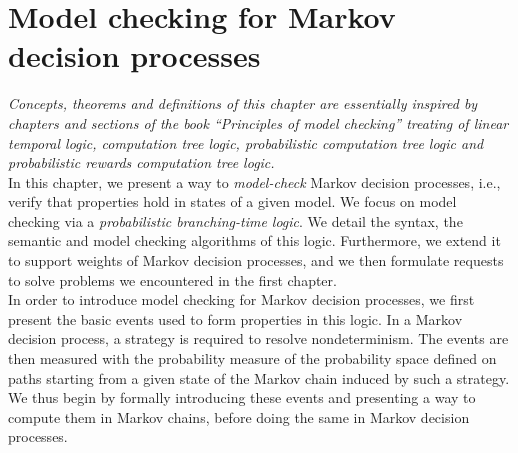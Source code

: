 \chapter{Model checking for Markov decision processes} \label{model-checking-chapter}

\textit{Concepts, theorems and definitions of this chapter are essentially inspired by chapters and sections of the book ``Principles of model checking'' \cite{PMC} treating of linear temporal logic, computation tree logic, probabilistic computation tree logic and probabilistic rewards computation tree logic.}\\

In this chapter, we present a way to \textit{model-check} Markov decision processes, i.e., verify that properties hold in states of a given model.
We focus on model checking via a \textit{probabilistic branching-time logic}. We detail the syntax, the semantic and model checking algorithms of this logic.
Furthermore, we extend it to support weights of Markov decision processes, and we then formulate requests to solve
problems we encountered in the first chapter. \\ %


In order to introduce model checking for Markov decision processes, we first present the basic events used to form properties in this logic.
In a Markov decision process, a strategy is required to resolve nondeterminism. The events are then measured with the probability measure of the probability space defined on paths starting from a given state of the Markov chain induced by such a strategy.
We thus begin by formally introducing these events %
and presenting a way to compute them in Markov chains, before doing the same in Markov decision processes.

